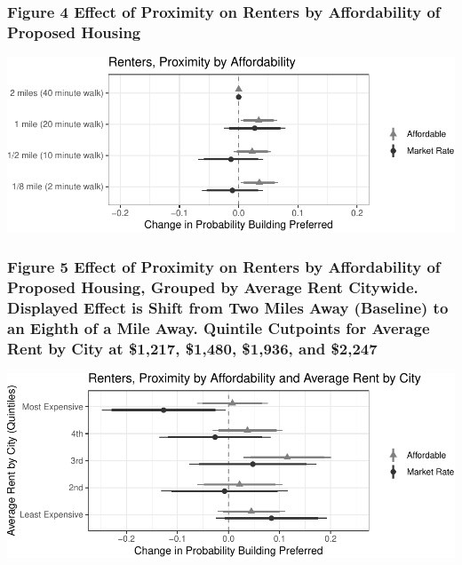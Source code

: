 \documentclass[]{article}
\begin{document}
\hypertarget{figure-4-effect-of-proximity-on-renters-by-affordability-of-proposed-housing}{%
\subsubsection{Figure 4 Effect of Proximity on Renters by Affordability of Proposed Housing}\label{figure-4-effect-of-proximity-on-renters-by-affordability-of-proposed-housing}}

\includegraphics{Zheng-Ruth-Renters-Paper_files/figure-latex/Figure 4-1.pdf}

\hypertarget{figure-5-effect-of-proximity-on-renters-by-affordability-of-proposed-housing-grouped-by-average-rent-citywide.-displayed-effect-is-shift-from-two-miles-away-baseline-to-an-eighth-of-a-mile-away.-quintile-cutpoints-for-average-rent-by-city-at-1217-1480-1936-and-2247}{%
\subsubsection{Figure 5 Effect of Proximity on Renters by Affordability of Proposed Housing, Grouped by Average Rent Citywide. Displayed Effect is Shift from Two Miles Away (Baseline) to an Eighth of a Mile Away. Quintile Cutpoints for Average Rent by City at \$1,217, \$1,480, \$1,936, and \$2,247}\label{figure-5-effect-of-proximity-on-renters-by-affordability-of-proposed-housing-grouped-by-average-rent-citywide.-displayed-effect-is-shift-from-two-miles-away-baseline-to-an-eighth-of-a-mile-away.-quintile-cutpoints-for-average-rent-by-city-at-1217-1480-1936-and-2247}}

\includegraphics{Zheng-Ruth-Renters-Paper_files/figure-latex/Print Figure 5-1.pdf}
\end{document}
